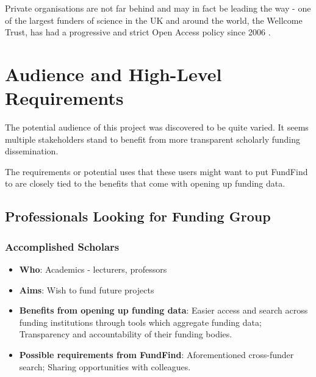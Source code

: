 Private organisations are not far behind and may in fact be leading the way - one of the largest funders of science in the UK and around the world, the Wellcome Trust, has had a progressive and strict Open Access policy since 2006 \cite{wellcome-oa}.

\section{Audience and High-Level Requirements}
\label{audience}
The potential audience of this project was discovered to be quite varied. It seems multiple stakeholders stand to benefit from more transparent scholarly funding dissemination.

The requirements or potential uses that these users might want to put FundFind to are closely tied to the benefits that come with opening up funding data.

\subsection{Professionals Looking for Funding Group}
\label{audience-professionals}
\subsubsection{Accomplished Scholars}
\begin{itemize}
 \item \textbf{Who}: Academics - lecturers, professors
 \item \textbf{Aims}: Wish to fund future projects
 \item \textbf{Benefits from opening up funding data}: Easier access and search across funding institutions through tools which aggregate funding data; Transparency and accountability of their funding bodies.
 \item \textbf{Possible requirements from FundFind}: Aforementioned cross-funder search; Sharing opportunities with colleagues.
\end{itemize}

